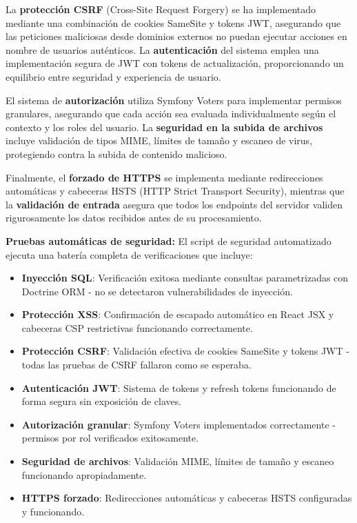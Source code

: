 \documentclass[12pt,a4paper,oneside]{report}
\begin{document}
La \textbf{protección CSRF} (Cross-Site Request Forgery) se ha implementado mediante una combinación de cookies SameSite y tokens JWT, asegurando que las peticiones maliciosas desde dominios externos no puedan ejecutar acciones en nombre de usuarios auténticos. La \textbf{autenticación} del sistema emplea una implementación segura de JWT con tokens de actualización, proporcionando un equilibrio entre seguridad y experiencia de usuario.

El sistema de \textbf{autorización} utiliza Symfony Voters para implementar permisos granulares, asegurando que cada acción sea evaluada individualmente según el contexto y los roles del usuario. La \textbf{seguridad en la subida de archivos} incluye validación de tipos MIME, límites de tamaño y escaneo de virus, protegiendo contra la subida de contenido malicioso.

Finalmente, el \textbf{forzado de HTTPS} se implementa mediante redirecciones automáticas y cabeceras HSTS (HTTP Strict Transport Security), mientras que la \textbf{validación de entrada} asegura que todos los endpoints del servidor validen rigurosamente los datos recibidos antes de su procesamiento.

\textbf{Pruebas automáticas de seguridad:} El script de seguridad automatizado ejecuta una batería completa de verificaciones que incluye:
\begin{itemize}
\item \textbf{Inyección SQL}: Verificación exitosa mediante consultas parametrizadas con Doctrine ORM - no se detectaron vulnerabilidades de inyección.
\item \textbf{Protección XSS}: Confirmación de escapado automático en React JSX y cabeceras CSP restrictivas funcionando correctamente.
\item \textbf{Protección CSRF}: Validación efectiva de cookies SameSite y tokens JWT - todas las pruebas de CSRF fallaron como se esperaba.
\item \textbf{Autenticación JWT}: Sistema de tokens y refresh tokens funcionando de forma segura sin exposición de claves.
\item \textbf{Autorización granular}: Symfony Voters implementados correctamente - permisos por rol verificados exitosamente.
\item \textbf{Seguridad de archivos}: Validación MIME, límites de tamaño y escaneo funcionando apropiadamente.
\item \textbf{HTTPS forzado}: Redirecciones automáticas y cabeceras HSTS configuradas y funcionando.
\end{itemize}
\end{document}
